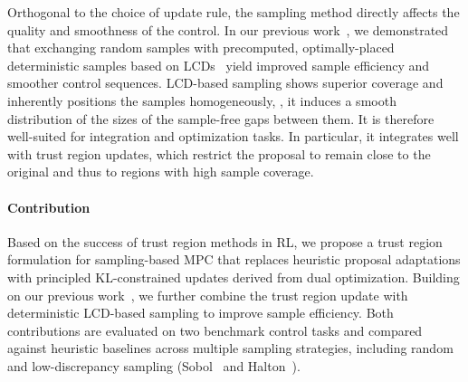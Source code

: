 Orthogonal to the choice of update rule, the sampling method directly affects the quality and smoothness of the control.
In our previous work~\cite{walkerSampleefficientSmoothCrossentropy2026,arXiv26_Walker_IFAC}, we demonstrated that exchanging random samples with precomputed, optimally-placed deterministic samples based on \acp{LCD}~\cite{CDC09_HanebeckHuber} yield improved sample efficiency and smoother control sequences.
\ac{LCD}-based sampling shows superior coverage and inherently positions the samples homogeneously, \ie, it induces a smooth distribution of the sizes of the sample-free gaps between them.
It is therefore well-suited for integration and optimization tasks.
In particular, it integrates well with trust region updates, which restrict the proposal to remain close to the original and thus to regions with high sample coverage.



%
%
\paragraph*{Contribution}

Based on the success of trust region methods in \ac{RL}, we propose a trust region formulation for sampling-based \ac{MPC} that replaces heuristic proposal adaptations with principled \ac{KL}-constrained updates derived from dual optimization.
Building on our previous work~\cite{walkerSampleefficientSmoothCrossentropy2026,arXiv26_Walker_IFAC}, we further combine the trust region update with deterministic \ac{LCD}-based sampling to improve sample efficiency.
Both contributions are evaluated on two benchmark control tasks and compared against heuristic baselines across multiple sampling strategies, including random and low-discrepancy sampling (Sobol~\cite{joeConstructingSobolSequences2008} and Halton~\cite{owen2017randomizedhaltonalgorithmr}).

